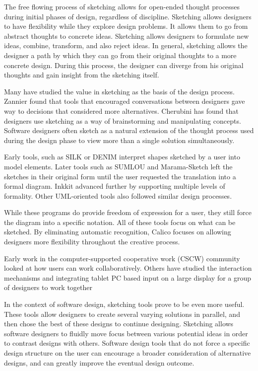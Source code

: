 The free flowing process of sketching allows for open-ended thought processes during initial phases of design, regardless of discipline. Sketching allows designers to have flexibility while they explore design problems. It allows them to go from abstract thoughts to concrete ideas\cite{todo}. Sketching allows designers to formulate new ideas, combine, transform, and also reject ideas\cite{todo}. In general, sketching allows the designer a path by which they can go from their original thoughts to a more concrete design. During this process, the designer can diverge from his original thoughts and gain insight from the sketching itself\cite{todo}.

Many have studied the value in sketching as the basis of the design process. Zannier found that tools that encouraged conversations between designers gave way to decisions that considered more alternatives\cite{todo}. Cherubini has found that designers use sketching as a way of brainstorming and manipulating concepts\cite{todo}. Software designers often sketch as a natural extension of the thought process used during the design phase to view more than a single solution simultaneously\cite{todo}.

Early tools, such as SILK\cite{todo} or DENIM\cite{todo} interpret shapes sketched by a user into model elements. Later tools such as SUMLOU\cite{todo} and Marama-Sketch\cite{todo} left the sketches in their original form until the user requested the translation into a formal diagram. Inkkit\cite{todo} advanced further by supporting multiple levels of formality. Other UML-oriented tools also followed similar design processes\cite{todo}.

While these programs do provide freedom of expression for a user, they still force the diagram into a specific notation. All of these tools focus on what can be sketched. By eliminating automatic recognition, Calico focuses on allowing designers more flexibility throughout the creative process.

Early work in the computer-supported cooperative work (CSCW) community looked at how users can work collaboratively. Others have studied the interaction mechanisms and integrating tablet PC based input on a large display for a group of designers to work together\cite{todo}


In the context of software design, sketching tools prove to be even more useful. These tools allow designers to create several varying solutions in parallel, and then chose the best of these designs to continue designing. Sketching allows software designers to fluidly move focus between various potential ideas in order to contrast designs with others. Software design tools that do not force a specific design structure on the user can encourage a broader consideration of alternative designs, and can greatly improve the eventual design outcome.
